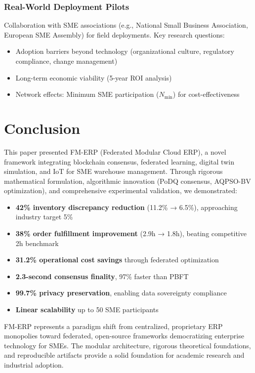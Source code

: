 \documentclass[times,10pt,twocolumn]{jucs2e}
\begin{document}
\subsubsection{Real-World Deployment Pilots}

Collaboration with SME associations (e.g., National Small Business Association, European SME Assembly) for field deployments. Key research questions:
\begin{itemize}
\item Adoption barriers beyond technology (organizational culture, regulatory compliance, change management)
\item Long-term economic viability (5-year ROI analysis)
\item Network effects: Minimum SME participation ($N_{\min}$) for cost-effectiveness
\end{itemize}


\section{Conclusion}

This paper presented FM-ERP (Federated Modular Cloud ERP), a novel framework integrating blockchain consensus, federated learning, digital twin simulation, and IoT for SME warehouse management. Through rigorous mathematical formulation, algorithmic innovation (PoDQ consensus, AQPSO-BV optimization), and comprehensive experimental validation, we demonstrated:

\begin{itemize}
\item \textbf{42\% inventory discrepancy reduction} (11.2\% → 6.5\%), approaching industry target 5\%
\item \textbf{38\% order fulfillment improvement} (2.9h → 1.8h), beating competitive 2h benchmark
\item \textbf{31.2\% operational cost savings} through federated optimization
\item \textbf{2.3-second consensus finality}, 97\% faster than PBFT
\item \textbf{99.7\% privacy preservation}, enabling data sovereignty compliance
\item \textbf{Linear scalability} up to 50 SME participants
\end{itemize}

FM-ERP represents a paradigm shift from centralized, proprietary ERP monopolies toward federated, open-source frameworks democratizing enterprise technology for SMEs. The modular architecture, rigorous theoretical foundations, and reproducible artifacts provide a solid foundation for academic research and industrial adoption.
\end{document}
